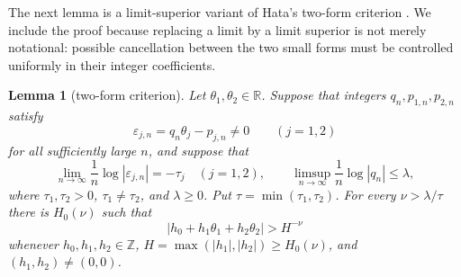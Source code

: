 \documentclass[preprint,12pt]{elsarticle}
\newtheorem{lemma}[theorem]{Lemma}
\theoremstyle{definition}
\newcommand{\Z}{\mathbb Z}
\newcommand{\R}{\mathbb R}
\newcommand{\eps}{\varepsilon}
\newcommand{\abs}[1]{\left|#1\right|}
\begin{document}
The next lemma is a limit-superior variant of Hata's two-form criterion
\cite[Lemma~2.1]{Hata1993}.  We include the proof because replacing a limit by
a limit superior is not merely notational: possible cancellation between the
two small forms must be controlled uniformly in their integer coefficients.

\begin{lemma}[two-form criterion]\label{lem:two-form}
Let $\theta_1,\theta_2\in\R$.  Suppose that integers
$q_n,p_{1,n},p_{2,n}$ satisfy
\[
 \eps_{j,n}=q_n\theta_j-p_{j,n}\ne0\qquad(j=1,2)
\]
for all sufficiently large $n$, and suppose that
\begin{equation}\label{eq:two-form-hypotheses}
 \lim_{n\to\infty}\frac1n\log\abs{\eps_{j,n}}=-\tau_j
 \quad(j=1,2),
 \qquad
 \limsup_{n\to\infty}\frac1n\log\abs{q_n}\le\lambda,
\end{equation}
where $\tau_1,\tau_2>0$, $\tau_1\ne\tau_2$, and $\lambda\ge0$.
Put $\tau=\min(\tau_1,\tau_2)$.  For every $\nu>\lambda/\tau$ there is
$H_0(\nu)$ such that
\[
 \abs{h_0+h_1\theta_1+h_2\theta_2}>H^{-\nu}
\]
whenever $h_0,h_1,h_2\in\Z$,
$H=\max(|h_1|,|h_2|)\ge H_0(\nu)$, and
$(h_1,h_2)\ne(0,0)$.
\end{lemma}
\end{document}
